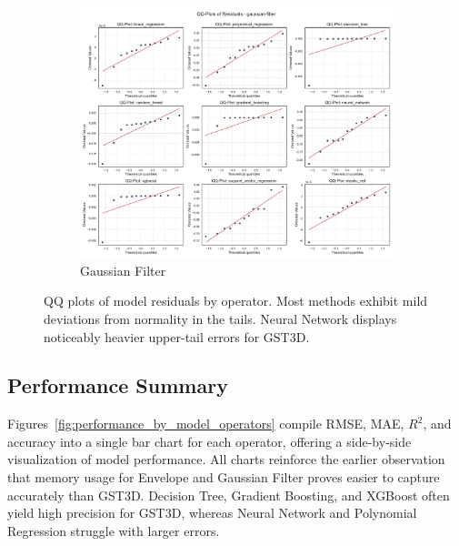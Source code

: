 \begin{figure}[htbp]
\begin{subfigure}[t]{0.32\textwidth}
        \includegraphics[width=\textwidth]{assets/images/05/residual_qq_plots_gaussian-filter}
        \caption{Gaussian Filter}
    \end{subfigure}
    \caption{\ac{QQ} plots of model residuals by operator.
    Most methods exhibit mild deviations from normality in the tails.
    Neural Network displays noticeably heavier upper-tail errors for \ac{GST3D}.}
    \label{fig:residual_qq_plots}
\end{figure}

\subsection{Performance Summary}
\label{subsec:performance-summary}

Figures~\ref{fig:performance_by_model_operators} compile \ac{RMSE}, \ac{MAE}, $R^2$, and accuracy into a single bar chart for each operator, offering a side-by-side visualization of model performance.
All charts reinforce the earlier observation that memory usage for Envelope and Gaussian Filter proves easier to capture accurately than \ac{GST3D}.
Decision Tree, Gradient Boosting, and XGBoost often yield high precision for \ac{GST3D}, whereas Neural Network and Polynomial Regression struggle with larger errors.

